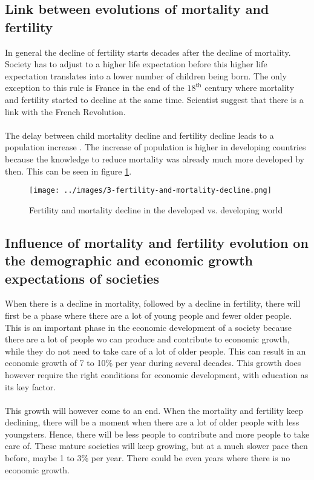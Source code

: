 \documentclass[../summary.tex]{subfiles}
\begin{document}
\subsection{Link between evolutions of mortality and fertility}
In general the decline of fertility starts decades after the decline of mortality. Society has to adjust to a higher life expectation before this higher life expectation translates into a lower number of children being born. The only exception to this rule is France in the end of the $\mathrm{18^{th}}$ century where mortality and fertility started to decline at the same time. Scientist suggest that there is a link with the French Revolution.
\\\\
The delay between child mortality decline and fertility decline leads to a population increase . The increase of population is higher in developing countries because the knowledge to reduce mortality was already much more developed by then. This can be seen in figure \ref{fig:fertility-and-mortality-decline}.

\begin{figure}[H]
	\centering
	\texttt{[image: ../images/3-fertility-and-mortality-decline.png]}
	\caption{Fertility and mortality decline in the developed vs. developing world}
	\label{fig:fertility-and-mortality-decline}
\end{figure}


\subsection{Influence of mortality and fertility evolution on the demographic and economic growth expectations of societies}
When there is a decline in mortality, followed by a decline in fertility, there will first be a phase where there are a lot of young people and fewer older people. This is an important phase in the economic development of a society because there are a lot of people wo can produce and contribute to economic growth, while they do not need to take care of a lot of older people. This can result in an economic growth of 7 to 10\% per year during several decades. This growth does however require the right conditions for economic development, with education as its key factor.
\\\\
This growth will however come to an end. When the mortality and fertility keep declining, there will be a moment when there are a lot of older people with less youngsters. Hence, there will be less people to contribute and more people to take care of. These mature societies will keep growing, but at a much slower pace then before, maybe 1 to 3\% per year. There could be even years where there is no economic growth.
\end{document}
